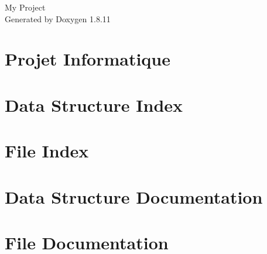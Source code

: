 \documentclass[twoside]{book}
\newcommand{\+}{\discretionary{\mbox{\scriptsize$\hookleftarrow$}}{}{}}
\newcommand{\clearemptydoublepage}{%
  \newpage{\pagestyle{empty}\cleardoublepage}%
}
\begin{document}
\hypersetup{pageanchor=false,
             bookmarksnumbered=true,
             pdfencoding=unicode
            }
\begin{titlepage}
\vspace*{7cm}
\begin{center}%
{\Large My Project }\\
\vspace*{1cm}
{\large Generated by Doxygen 1.8.11}\\
\end{center}
\end{titlepage}
\clearemptydoublepage
\tableofcontents
\clearemptydoublepage
{}
\hypersetup{pageanchor=true}

\chapter{Projet Informatique}
\label{index}\hypertarget{index}{}
\chapter{Data Structure Index}

\chapter{File Index}

\chapter{Data Structure Documentation}
















\chapter{File Documentation}














\backmatter
\newpage
{}
\clearemptydoublepage
{}
\printindex
\end{document}
